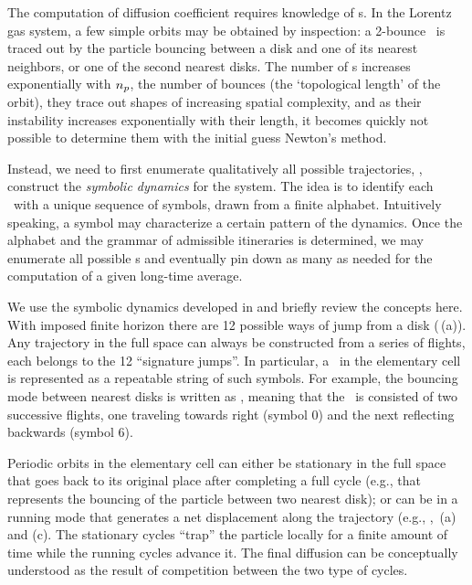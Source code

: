 


The computation of diffusion coefficient  requires
knowledge of \po s. In the Lorentz gas system, a few simple orbits may be
obtained by inspection: a 2-bounce \po\ is traced out by the particle
bouncing between a disk and one of its nearest neighbors, or one of the
second nearest disks. The number of \po s increases exponentially with
${n_{p}}$, the number of bounces (the `topological length' of the
orbit), they trace out shapes of increasing spatial complexity, and as
their instability increases exponentially with their length, it
becomes quickly not possible to determine them with the initial guess
Newton's method.

Instead, we need to first enumerate qualitatively all possible
trajectories, \ie, construct the \emph{symbolic dynamics} for the system.
The idea is to identify each \po\ with a unique sequence of symbols,
drawn from a finite alphabet. Intuitively speaking, a symbol may
characterize a certain pattern of the dynamics. Once the alphabet and the
grammar of admissible itineraries is determined, we may enumerate all
possible \po s and eventually pin down as many as needed for the
computation of a given long-time average.

We use the symbolic dynamics developed in  and briefly
review the concepts here. With imposed finite horizon there are 12
possible ways of jump from a disk
(\,(a)). Any trajectory in the full
space can always be constructed from a series of flights, each belongs
to the 12 ``signature jumps''. In particular, a \po\ in the
elementary cell is represented as a repeatable string of such symbols.
For example, the bouncing mode between nearest disks is written as
, meaning that the \po\ is consisted of two
successive flights, one traveling towards right (symbol $0$) and the
next reflecting backwards (symbol $6$).

Periodic orbits in the elementary cell can either be stationary in the
full space that goes back to its original place after completing a
full cycle (e.g.,  that represents the bouncing of the
particle between two nearest disk); or can be in a running mode that
generates a net displacement along the trajectory (e.g., ,
\,(a) and (c). The stationary cycles
``trap'' the  particle locally for a finite amount of time while the
running cycles advance it. The final diffusion 
can be conceptually understood as the result of competition between
the two type of cycles.

